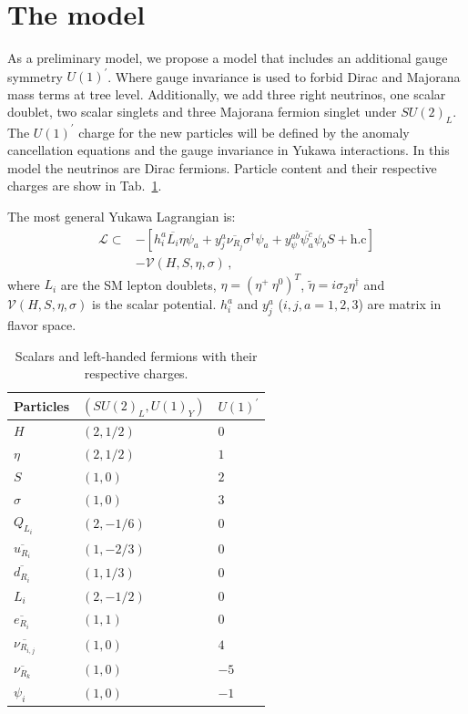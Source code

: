 \documentclass[12pt]{article}
\begin{document}
\section{The model}
\label{sec:Model}
As a preliminary model, we propose a model that includes an additional gauge symmetry $U(1)^{\prime}$.  Where  gauge invariance is used to forbid Dirac and Majorana mass terms at tree level. Additionally, we add three right neutrinos, one scalar doublet, two scalar singlets and three Majorana fermion singlet under $SU(2)_L$. The $U(1)^{\prime}$ charge for the new particles will be defined by the anomaly cancellation equations and the gauge invariance in Yukawa interactions. In this model the neutrinos are Dirac fermions. Particle content and their respective charges are show in Tab.~\ref{tab:partcont}. 

The most general Yukawa Lagrangian is:
%
\begin{align*}
\label{Eq:LagY}
    \mathcal{L} \subset& -[ 
    h^{a}_{i} \overline{L_{i}} \eta \psi_{a} +  y^{a}_{j} \overline{\nu_{R_{j}}} \sigma^{\dagger} \psi_{a} + y_{\psi}^{a b} \overline{\psi^{c}_{a}} \psi_{b} S + \text{h.c}] \\
    &- \mathcal{V}(H, S, \eta, \sigma)\,,
\end{align*}
%
where $L_{i}$ are the SM lepton doublets, $\eta = \left( \eta^{+} \ \eta^{0} \right)^{T}$, $\widetilde{\eta} = i \sigma_2 \eta^{\dagger}$ and $\mathcal{V}(H, S, \eta, \sigma)$ is the scalar potential. $h^{a}_i$ and $y^{a}_{j}$ ($i,j,a=1,2,3$) are matrix in flavor space.
%
\begin{table}
  \centering
  \begin{tabular}{|l|l|l|}
    \hline  
    Particles     & $\left( SU(2)_L, U(1)_Y \right)$ & $U(1)^{\prime}$ \\ \hline
    $H $  & $(2, 1/2)$ &  0 \\
    $\eta$ & $(2,1/2)$ & $1$ \\
    $S$ & $(1,0)$ & $2$ \\
    $\sigma$ & $(1,0)$ & $3$ \\
    \hline
    $Q_{L_{i}}$  & $(2,-1/6)$ & $0$ \\
    $\overline{u_{R_{i}}}$ & $(1,-2/3)$ & $0$ \\
    $\overline{d_{R_{i}}}$ & $(1,1/3)$ & $0$ \\
    \hline
    $L_i$  & $(2,-1/2)$ & $0$ \\
    $\overline{e_{R_i}}$ & $(1,1)$ & $0$ \\
    $\overline{\nu_{R_{i,j}}}$ & $(1,0)$ & $4$\\
    $\overline{\nu_{R_k}}$ & $(1,0)$ & $-5$\\
    $\psi_{i}$  & $(1,0)$ & $-1$ \\\hline
  \end{tabular}
  \caption{Scalars and left-handed fermions with their respective charges.}
  \label{tab:partcont}
\end{table}
%
\end{document}
